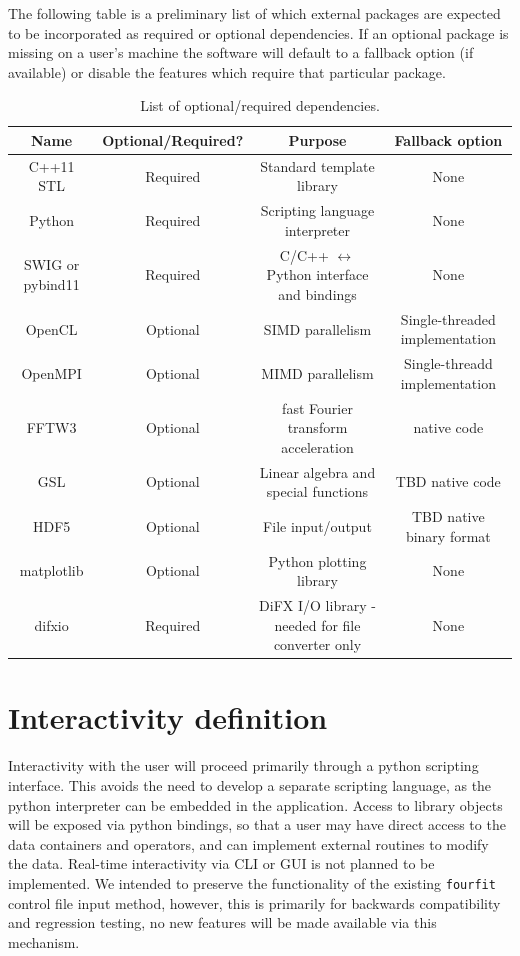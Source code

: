 \documentclass[hidelinks]{article}
\let\Oldsection\section
\renewcommand{\section}{\FloatBarrier\Oldsection}
\begin{document}
The following table is a preliminary list of which external packages are expected to be incorporated as required or optional dependencies. If an optional package is missing on a user's machine the software will default to a fallback option (if available) or disable the features which require that particular package.

\begin{center}
\begin{table}[h!]
\begin{adjustbox}{width=\textwidth}
\begin{tabular}{|c|c|c|c|}
\hline
Name & Optional/Required? & Purpose & Fallback option \\ \hline
C++11 STL & Required & Standard template library & None \\ \hline
Python &  Required & Scripting language interpreter & None \\ \hline
SWIG or pybind11 & Required & C/C++ $\leftrightarrow$ Python interface and bindings & None \\ \hline
OpenCL & Optional & SIMD parallelism & Single-threaded implementation \\ \hline
OpenMPI & Optional & MIMD parallelism & Single-threadd implementation \\ \hline
FFTW3 & Optional & fast Fourier transform acceleration & native code \\ \hline
GSL & Optional & Linear algebra and special functions & TBD native code \\ \hline
HDF5 & Optional & File input/output & TBD native binary format \\ \hline
matplotlib & Optional & Python plotting library & None \\ \hline
difxio & Required & DiFX I/O library - needed for file converter only & None \\ \hline
\end{tabular}
\end{adjustbox}
\caption{List of optional/required dependencies.}
\label{tab:dep}
\end{table}
\end{center}


\section{Interactivity definition}

Interactivity with the user will proceed primarily through a python scripting interface. This avoids the need to develop a separate scripting language, 
as the python interpreter can be embedded in the application. Access to library objects will be exposed via python bindings, so that a user may have direct access 
to the data containers and operators, and can implement external routines to modify the data. Real-time interactivity via CLI or GUI is 
not planned to be implemented. We intended to preserve the functionality of the existing \texttt{fourfit} control file input method, however, this
is primarily for backwards compatibility and regression testing, no new features will be made available via this mechanism.
\end{document}

